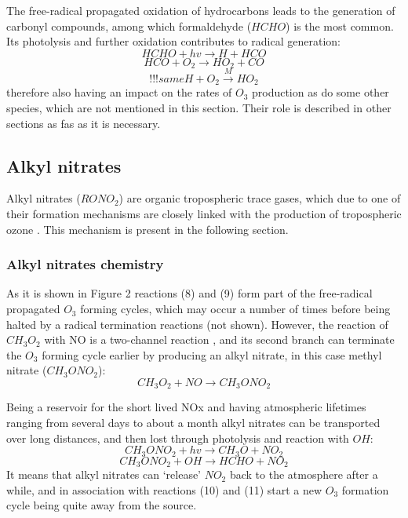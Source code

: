 \documentclass[11pt,a4paper]{article}
\begin{document}
The free-radical propagated oxidation of hydrocarbons leads to the generation of carbonyl compounds, among which formaldehyde ($HCHO$) is the most common. Its photolysis and further oxidation contributes to radical generation:
\begin{equation}\label{reac:HCHO+hv=H+HCO}
HCHO + hv \rightarrow H + HCO
\end{equation}
\begin{equation}\label{reac:HCO+O2=HO2+CO}
HCO + O_2 \rightarrow HO_2 + CO
\end{equation}
\begin{equation}\label{reac:H+O2=HO2}
!!!sameH + O_2 \xrightarrow{M} HO_2
\end{equation}
therefore also having an impact on the rates of $O_3$ production \citep{Fowler2008} as do some other species, which are not mentioned in this section. Their role is described in other sections as fas as it is necessary.

\subsection{Alkyl nitrates}
Alkyl nitrates ($RONO_2$) are organic tropospheric trace gases, which   due to one of their formation mechanisms are closely linked with the production of tropospheric ozone \citep{Reeves2007}. This mechanism is present in the following section.

\subsubsection*{Alkyl nitrates chemistry}

As it is shown in Figure 2 reactions (8) and (9) form part of the free-radical propagated $O_3$ forming cycles, which may occur a number of times before being halted by a radical termination reactions (not shown). However, the reaction of $CH_3O_2$ with NO is a two-channel reaction \citep{Day2003}, and its second branch can terminate the $O_3$ forming cycle earlier by producing an alkyl nitrate, in this case methyl nitrate ($CH_3ONO_2$):
\begin{equation} \label{eq:CH3NO3form}
CH_3O_2 + NO \rightarrow CH_3ONO_2
\end{equation}

Being a reservoir for the short lived NOx and having atmospheric lifetimes ranging from several days to about a month \citep{Reeves2007} alkyl nitrates can be transported over long distances, and then lost through photolysis and reaction with $OH$:
\begin{equation} \label{eq:CH3NO3+hv}
CH_3ONO_2 + hv \rightarrow CH_3O + NO_2
\end{equation}
\begin{equation} \label{eq:CH3NO3+OH}
CH_3ONO_2 + OH \rightarrow HCHO + NO_2
\end{equation}
It means that alkyl nitrates can ‘release’ $NO_2$ back to the atmosphere after a while, and in association with reactions (10) and (11) start a new $O_3$ formation cycle being quite away from the source.
\end{document}
